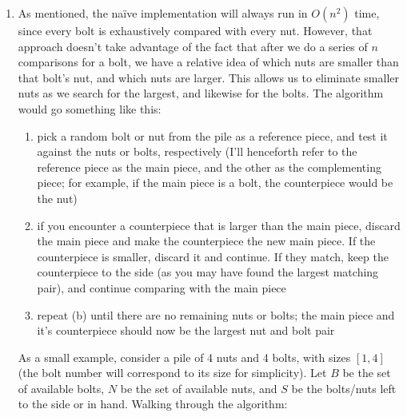 \documentclass[12pt]{article}
\begin{document}
\begin{enumerate}
    \item As mentioned, the naïve implementation will always run in $O(n^2)$ time, since every bolt is exhaustively 
    compared with every nut. However, that approach doesn't take advantage of the fact that after we do a series of $n$ 
    comparisons for a bolt, we have a relative idea of which nuts are smaller than that bolt's nut, and which nuts are 
    larger. This allows us to eliminate smaller nuts as we search for the largest, and likewise for the bolts. The algorithm 
    would go something like this:

    \begin{enumerate}
        \item pick a random bolt or nut from the pile as a reference piece, and test it against the nuts or bolts, respectively 
        (I'll henceforth refer to the reference piece as the main piece, and the other as the complementing piece; for example, if the main piece is 
        a bolt, the counterpiece would be the nut)
        \item if you encounter a counterpiece that is larger than the main piece, discard the main piece and make the counterpiece 
        the new main piece. If the counterpiece is smaller, discard it and continue. If they match, keep the counterpiece to the side 
        (as you may have found the largest matching pair), and continue comparing with the main piece
        \item repeat (b) until there are no remaining nuts or bolts; the main piece and it's counterpiece should now be the 
        largest nut and bolt pair
    \end{enumerate}

    As a small example, consider a pile of 4 nuts and 4 bolts, with sizes $[1, 4]$ (the bolt number will correspond to its 
    size for simplicity). Let $B$ be the set of available bolts, $N$ be the set of available nuts, and $S$ be the bolts/nuts 
    left to the side or in hand. Walking through the algorithm:


\end{enumerate}
\end{document}
